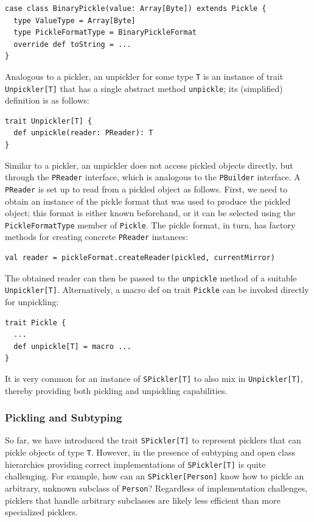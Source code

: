 \documentclass[preprint,10pt]{sigplanconf}
\theoremstyle{definition}
\theoremstyle{definition}
\begin{document}
\begin{lstlisting}
case class BinaryPickle(value: Array[Byte]) extends Pickle {
  type ValueType = Array[Byte]
  type PickleFormatType = BinaryPickleFormat
  override def toString = ...
}
\end{lstlisting}
\noindent


Analogous to a pickler, an unpickler for some type \verb|T| is an instance of
trait \verb|Unpickler[T]| that has a single abstract method \verb|unpickle|;
its (simplified) definition is as follows:

\begin{lstlisting}
trait Unpickler[T] {
  def unpickle(reader: PReader): T
}
\end{lstlisting}
\noindent

Similar to a pickler, an unpickler does not access pickled objects directly,
but through the \verb|PReader| interface, which is analogous to the
\verb|PBuilder| interface. A \verb|PReader| is set up to read from a pickled
object as follows. First, we need to obtain an instance of the pickle format
that was used to produce the pickled object; this format is either known
beforehand, or it can be selected using the \verb|PickleFormatType| member of
\verb|Pickle|. The pickle format, in turn, has factory methods for creating
concrete \verb|PReader| instances:

\begin{lstlisting}
val reader = pickleFormat.createReader(pickled, currentMirror)
\end{lstlisting}

The obtained reader can then be passed to the \verb|unpickle| method of a
suitable \verb|Unpickler[T]|. Alternatively, a macro def on trait
\verb|Pickle| can be invoked directly for unpickling:

\begin{lstlisting}
trait Pickle {
  ...
  def unpickle[T] = macro ...
}
\end{lstlisting}
\noindent
It is very common for an instance of \verb|SPickler[T]| to also mix in
\verb|Unpickler[T]|, thereby providing both pickling and unpickling
capabilities.


\subsubsection{Pickling and Subtyping}

So far, we have introduced the trait \verb|SPickler[T]| to represent picklers
that can pickle objects of type \verb|T|. However, in the presence of
subtyping and open class hierarchies providing correct implementations of
\verb|SPickler[T]| is quite challenging. For example, how can an
\verb|SPickler[Person]| know how to pickle an arbitrary, unknown subclass of
\verb|Person|? Regardless of implementation challenges, picklers that handle
arbitrary subclasses are likely less efficient than more specialized picklers.
\end{document}

